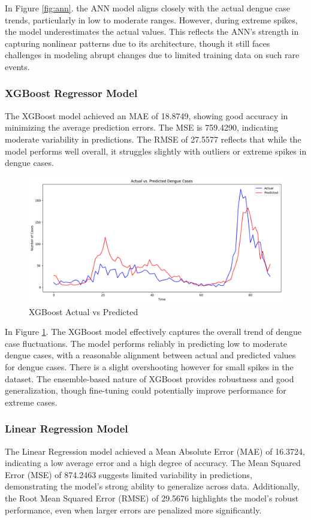 \documentclass{article}
\begin{document}
In Figure \ref{fig:ann}. the ANN model aligns closely with the actual dengue case trends, particularly in low to moderate ranges. However, during extreme spikes, the model underestimates the actual values. This reflects the ANN’s strength in capturing nonlinear patterns due to its architecture, though it still faces challenges in modeling abrupt changes due to limited training data on such rare events.

\subsubsection{XGBoost Regressor Model}
The XGBoost model achieved an MAE of 18.8749, showing good accuracy in minimizing the average prediction errors. The MSE is 759.4290, indicating moderate variability in predictions. The RMSE of 27.5577 reflects that while the model performs well overall, it struggles slightly with outliers or extreme spikes in dengue cases.

\begin{figure}[h!]
    \centering
    \includegraphics[width=1\linewidth]{image/XGBoost plot.png}
    \caption{XGBoost Actual vs Predicted}
    \label{fig:xgb}
\end{figure}

In Figure \ref{fig:xgb}. The XGBoost model effectively captures the overall trend of dengue case fluctuations. The model performs reliably in predicting low to moderate dengue cases, with a reasonable alignment between actual and predicted values for dengue cases. There is a slight overshooting however for small spikes in the dataset. The ensemble-based nature of XGBoost provides robustness and good generalization, though fine-tuning could potentially improve performance for extreme cases.

\subsubsection{Linear Regression Model}
The Linear Regression model achieved a Mean Absolute Error (MAE) of 16.3724, indicating a low average error and a high degree of accuracy. The Mean Squared Error (MSE) of 874.2463 suggests limited variability in predictions, demonstrating the model's strong ability to generalize across data. Additionally, the Root Mean Squared Error (RMSE) of 29.5676 highlights the model's robust performance, even when larger errors are penalized more significantly.\\
\end{document}
